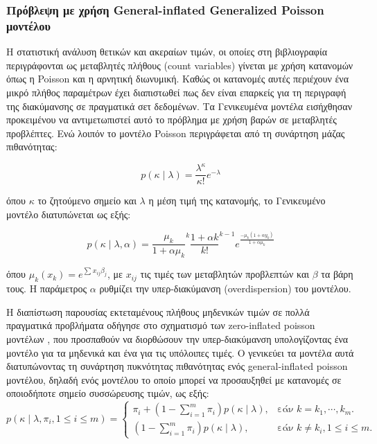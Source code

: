 \subsubsection{Πρόβλεψη με χρήση General-inflated Generalized Poisson μοντέλου} \label{section:GIGP}
Η στατιστική ανάλυση θετικών και ακεραίων τιμών, οι οποίες στη βιβλιογραφία περιγράφονται ως μεταβλητές πλήθους (count variables) γίνεται με χρήση κατανομών όπως η Poisson και η αρνητική διωνυμική. Καθώς οι κατανομές αυτές περιέχουν ένα μικρό πλήθος παραμέτρων έχει διαπιστωθεί πως δεν είναι επαρκείς για τη περιγραφή της διακύμανσης σε πραγματικά σετ δεδομένων. Τα Γενικευμένα μοντέλα \citep{Neld:Wedd:1972} εισήχθησαν προκειμένου να αντιμετωπιστεί αυτό το πρόβλημα με χρήση βαρών σε μεταβλητές προβλέπτες. Ενώ λοιπόν το μοντέλο Poisson περιγράφεται από τη συνάρτηση μάζας πιθανότητας:

\begin{equation}
 p(\kappa \mid \lambda) = \frac{\lambda^\kappa}{\kappa!} e^{-\lambda}
 \label{eq:poisson}
\end{equation}   

όπου $\kappa$ το ζητούμενο σημείο και $\lambda$ η μέση τιμή της κατανομής, το Γενικευμένο μοντέλο διατυπώνεται ως εξής:

\begin{equation}
 p(\kappa \mid \lambda, \alpha) = \frac{\mu_k}{1+\alpha \mu_k} ^k \frac{1+\alpha k}{k!}^{k-1} e^{\frac{-\mu_k(1+\alpha y_k)}{1+\alpha \mu_k}}
 \label{eq:gpoisson}
\end{equation}

όπου $\mu_k(x_k) = e^{\sum_{}^{} x_{ij} \beta_j}$, με $x_{ij}$ τις τιμές των μεταβλητών προβλεπτών και $\beta$ τα βάρη τους. Η παράμετρος $\alpha$ ρυθμίζει την υπερ-διακύμανση (overdispersion) του μοντέλου.

Η διαπίστωση παρουσίας εκτεταμένους πλήθους μηδενικών τιμών σε πολλά πραγματικά προβλήματα οδήγησε στο σχηματισμό των zero-inflated poisson μοντέλων \citep{Lambert:1992:ZPR:149268.149270}, που προσπαθούν να διορθώσουν την υπερ-διακύμανση υπολογίζοντας ένα μοντέλο για τα μηδενικά και ένα για τις υπόλοιπες τιμές. Ο \citet{gip} γενικεύει τα μοντέλα αυτά διατυπώνοντας τη συνάρτηση πυκνότητας πιθανότητας ενός general-inflated poisson μοντέλου, δηλαδή ενός μοντέλου το οποίο μπορεί να προσαυξηθεί με κατανομές σε οποιοδήποτε σημείο συσσώρευσης τιμών, ως εξής: 
\begin{equation}
 p(\kappa \mid \lambda, \pi_i, 1 \leq i \leq m) = \begin{cases}
 \pi_i + (1-\sum_{i=1}^{m} \pi_i) p(\kappa \mid \lambda) , & \text{εάν $k=k_1, \cdots, k_m$}.\\
 (1-\sum_{i=1}^{m} \pi_i) p(\kappa \mid \lambda), & \text{εάν $k \neq k_i, 1 \leq i \leq m$}.
 \end{cases}
\end{equation}

